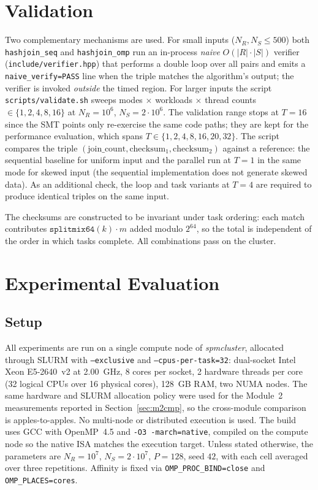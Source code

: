 \documentclass[10pt,twocolumn,a4paper]{article}
\begin{document}
\section{Validation}
Two complementary mechanisms are used. For small inputs
($N_R, N_S \le 500$) both \texttt{hashjoin\_seq} and
\texttt{hashjoin\_omp} run an in-process \emph{naive} $O(|R|\cdot|S|)$
verifier (\texttt{include/verifier.hpp}) that performs a double loop
over all pairs and emits a \texttt{naive\_verify=PASS} line when the
triple matches the algorithm's output; the verifier is invoked
\emph{outside} the timed region. For larger inputs the script
\texttt{scripts/validate.sh} sweeps modes $\times$ workloads
$\times$ thread counts $\in\{1,2,4,8,16\}$ at $N_R{=}10^6$,
$N_S{=}2{\cdot}10^6$. The validation range stops at $T{=}16$ since
the SMT points only re-exercise the same code paths; they are kept
for the performance evaluation, which spans
$T\!\in\!\{1,2,4,8,16,20,32\}$. The script compares the triple
$(\text{join\_count},\text{checksum}_1,\text{checksum}_2)$ against a
reference: the sequential baseline for uniform input and the
parallel run at $T=1$ in the same mode for skewed input (the
sequential implementation does not generate skewed data). As an
additional check, the loop and task variants at $T=4$ are required to
produce identical triples on the same input.

The checksums are constructed to be invariant under task ordering:
each match contributes $\texttt{splitmix64}(k)\cdot m$ added modulo
$2^{64}$, so the total is independent of the order in which tasks
complete. All combinations pass on the cluster.

\section{Experimental Evaluation}

\subsection{Setup}
All experiments are run on a single compute node of
\textit{spmcluster}, allocated through SLURM with
\texttt{--exclusive} and \texttt{--cpus-per-task=32}: dual-socket
Intel Xeon E5-2640~v2 at 2.00~GHz, 8 cores per socket, 2 hardware
threads per core (32 logical CPUs over 16 physical cores), 128~GB
RAM, two NUMA nodes. The same hardware and SLURM allocation policy
were used for the Module~2 measurements reported in
Section~\ref{sec:m2cmp}, so the cross-module comparison is
apples-to-apples. No multi-node or distributed execution is used.
The build uses GCC with OpenMP~4.5 and \texttt{-O3 -march=native},
compiled on the compute node so the native ISA matches the
execution target. Unless stated otherwise, the parameters
are $N_R = 10^7$, $N_S = 2\cdot 10^7$, $P=128$, seed $42$, with each
cell averaged over three repetitions. Affinity is fixed via
\texttt{OMP\_PROC\_BIND=close} and \texttt{OMP\_PLACES=cores}.
\end{document}
